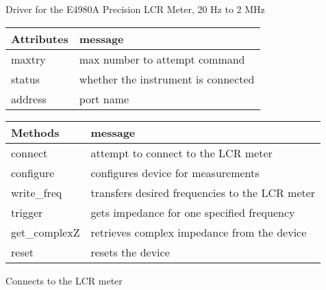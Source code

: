 \documentclass[letterpaper,10pt,english]{sphinxmanual}
\begin{document}

\begin{fulllineitems}
\label{\detokenize{drivers:drivers.LCR}}
Driver for the E4980A Precision LCR Meter, 20 Hz to 2 MHz


\begin{savenotes}\sphinxattablestart
\centering
\begin{tabulary}{\linewidth}[t]{|T|T|}
\hline
\sphinxstyletheadfamily 
Attributes
&\sphinxstyletheadfamily 
message
\\
\hline
maxtry
&
max number to attempt command
\\
\hline
status
&
whether the instrument is connected
\\
\hline
address
&
port name
\\
\hline
\end{tabulary}
\par
\sphinxattableend\end{savenotes}


\begin{savenotes}\sphinxattablestart
\centering
\begin{tabulary}{\linewidth}[t]{|T|T|}
\hline
\sphinxstyletheadfamily 
Methods
&\sphinxstyletheadfamily 
message
\\
\hline
connect
&
attempt to connect to the LCR meter
\\
\hline
configure
&
configures device for measurements
\\
\hline
write\_freq
&
transfers desired frequencies to the LCR meter
\\
\hline
trigger
&
gets impedance for one specified frequency
\\
\hline
get\_complexZ
&
retrieves complex impedance from the device
\\
\hline
reset
&
resets the device
\\
\hline
\end{tabulary}
\par
\sphinxattableend\end{savenotes}

\begin{fulllineitems}
\label{\detokenize{drivers:drivers.LCR._connect}}
Connects to the LCR meter


\end{fulllineitems}
\end{fulllineitems}
\end{document}
